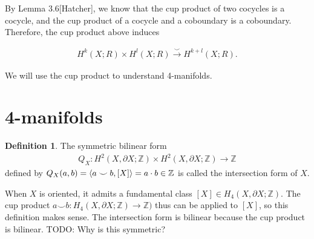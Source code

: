 \documentclass[11pt, psamsfonts]{amsart}
\theoremstyle{definition}
\newtheorem{defn}[thm]{Definition}
\theoremstyle{remark}
\numberwithin{equation}{section}
\begin{document}
By Lemma 3.6[Hatcher], we know that the cup product of two cocycles is a cocycle, and the cup product of a cocycle and a coboundary is a coboundary.
Therefore, the cup product above induces

\begin{align*}
  H^k(X; R) \times H^l(X; R) \xrightarrow{\smile} H^{k + l}(X; R).
\end{align*}

We will use the cup product to understand 4-manifolds.

\section{4-manifolds}

\begin{defn}
  The symmetric bilinear form
  \begin{align*}
    Q_X:H^2(X, \partial X; \mathbb{Z}) \times H^2(X, \partial X; \mathbb{Z}) \rightarrow \mathbb{Z}
  \end{align*}
  defined by $Q_X(a, b) = \ev{a \smile b, [X]} = a \cdot b \in \mathbb{Z}$ is called the intersection form of $X$.
\end{defn}

When $X$ is oriented, it admits a fundamental class $[X] \in H_4(X, \partial X; \mathbb{Z})$.
The cup product $a \smile b: H_4(X, \partial X; \mathbb{Z}) \rightarrow \mathbb{Z})$ thus can be applied to $[X]$, so this definition makes sense.
The intersection form is bilinear because the cup product is bilinear.
TODO: Why is this symmetric?
\end{document}
